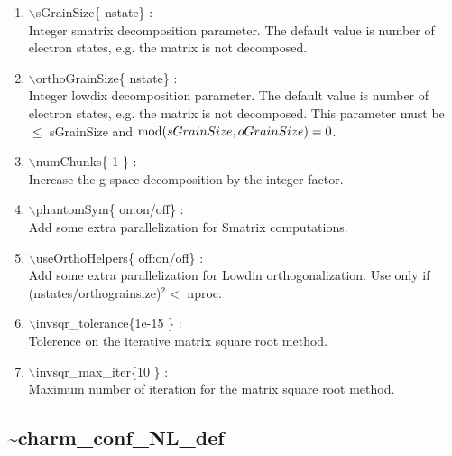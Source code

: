 \documentclass[12pt,titlepage]{article}
\begin{document}
\begin{enumerate}
  \vspace{0.15in} 
  \item $\backslash$sGrainSize\{ nstate\} : \\    
  Integer smatrix decomposition parameter. The default value is number of
  electron states, e.g. the matrix is not decomposed.
  \vspace{0.15in} 
  \item $\backslash$orthoGrainSize\{ nstate\} : \\    
  Integer lowdix decomposition parameter. The default value is number of
  electron states, e.g. the matrix is not decomposed. This parameter
  must be $\leq$ sGrainSize and ${\rm mod}(sGrainSize,oGrainSize)=0$.
  \vspace{0.15in} 
  \item $\backslash$numChunks\{ 1 \} : \\    
  Increase the g-space decomposition by the integer factor.
  \vspace{0.15in} 
  \item $\backslash$phantomSym\{ on:on/off\} : \\    
  Add some extra parallelization for Smatrix computations.
  \vspace{0.15in} 
  \item $\backslash$useOrthoHelpers\{ off:on/off\} : \\    
  Add some extra parallelization for Lowdin orthogonalization.
  Use only if (nstates/orthograinsize)$^2<$ nproc.
  \vspace{0.15in} 
  \item $\backslash$invsqr\_tolerance\{1e-15 \} : \\   
  Tolerence on the iterative matrix square root method.
  \vspace{0.15in} 
  \item $\backslash$invsqr\_max\_iter\{10 \} : \\    
  Maximum number of iteration for the matrix square root method.
\end{enumerate}

\newpage
\subsection*{\bf \~{ }charm\_conf\_NL\_def}
\end{document}
